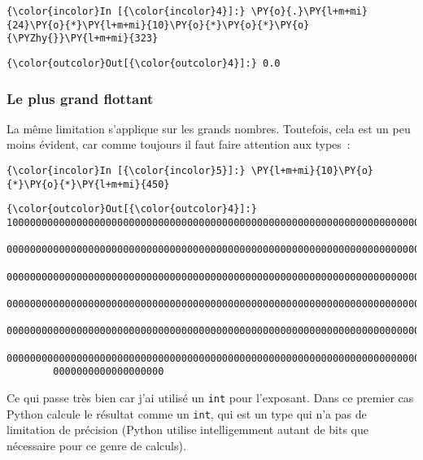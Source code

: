     \begin{Verbatim}[commandchars=\\\{\}]
{\color{incolor}In [{\color{incolor}4}]:} \PY{o}{.}\PY{l+m+mi}{24}\PY{o}{*}\PY{l+m+mi}{10}\PY{o}{*}\PY{o}{*}\PY{o}{\PYZhy{}}\PY{l+m+mi}{323}
\end{Verbatim}


\begin{Verbatim}[commandchars=\\\{\}]
{\color{outcolor}Out[{\color{outcolor}4}]:} 0.0
\end{Verbatim}
            
    \hypertarget{le-plus-grand-flottant}{%
\subsubsection{Le plus grand flottant}\label{le-plus-grand-flottant}}

    La même limitation s'applique sur les grands nombres. Toutefois, cela
est un peu moins évident, car comme toujours il faut faire attention aux
types~:

    \begin{Verbatim}[commandchars=\\\{\}]
{\color{incolor}In [{\color{incolor}5}]:} \PY{l+m+mi}{10}\PY{o}{*}\PY{o}{*}\PY{l+m+mi}{450}
\end{Verbatim}


\begin{Verbatim}[commandchars=\\\{\}]
{\color{outcolor}Out[{\color{outcolor}4}]:} 100000000000000000000000000000000000000000000000000000000000000000000000\\
        000000000000000000000000000000000000000000000000000000000000000000000000\\
        000000000000000000000000000000000000000000000000000000000000000000000000\\
        000000000000000000000000000000000000000000000000000000000000000000000000\\
        000000000000000000000000000000000000000000000000000000000000000000000000\\
        000000000000000000000000000000000000000000000000000000000000000000000000\\
        0000000000000000000
\end{Verbatim}
            
    Ce qui passe très bien car j'ai utilisé un \texttt{int} pour l'exposant.
Dans ce premier cas Python calcule le résultat comme un \texttt{int},
qui est un type qui n'a pas de limitation de précision (Python utilise
intelligemment autant de bits que nécessaire pour ce genre de calculs).\\

